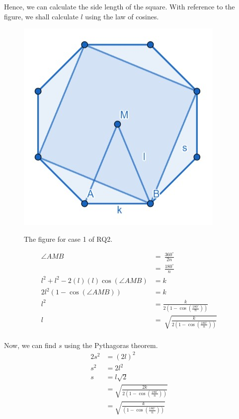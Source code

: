 \documentclass[12pt]{scrartcl}
\begin{document}
Hence, we can calculate the side length of the square. With reference to the figure, we shall calculate $l$ using the law of cosines. \\

\begin{figure}[h!]
	\centering
	\includegraphics[scale=.75]{images/rq2_1_2.jpg}
	\label{fig:rq2_1_2_img}
	\caption{The figure for case 1 of RQ2.}
\end{figure}

\begin{align*}
	\angle AMB\ & =\ \frac{360^{\circ}}{2n}\      \\
	& =\ \frac{180^{\circ}}{n}          \\
	l^{2}+l^{2}-2\left(l\right)\left(l\right)\cos\left(\angle AMB\right) & =k    \\
	2l^{2}\left(1-\cos\left(\angle AMB\right)\right)\ & =k           \\
	l^{2} & =\frac{k}{2\left(1-\cos\left(\frac{180^{\circ}}{n}\right)\right)}   \\
	l\ & =\ \sqrt{\frac{k}{2\left(1-\cos\left(\frac{180^{\circ}}{n}\right)\right)}}    \\
\end{align*}

Now, we can find $s$ using the Pythagoras theorem. \\

\begin{align*}
  2s^{2} & = \left(2l\right)^{2}    \\
	s^{2} & = 2l^{2}   \\
	s & = l\sqrt{2}    \\
	& = \sqrt{\frac{2k}{2\left(1-\cos\left(\frac{180^{\circ}}{n}\right)\right)}} \\
	& = \sqrt{\frac{k}{\left(1-\cos\left(\frac{180^{\circ}}{n}\right)\right)}} \\
\end{align*}

\printbibliography
\end{document}
